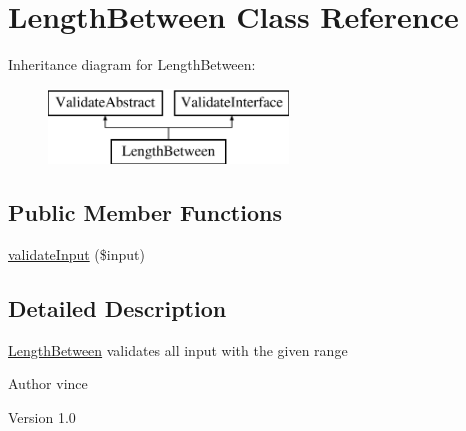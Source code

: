 \hypertarget{class_anemo_1_1_validate_1_1_adapter_1_1_length_between}{
\section{LengthBetween Class Reference}
\label{class_anemo_1_1_validate_1_1_adapter_1_1_length_between}
}
Inheritance diagram for LengthBetween:\begin{figure}[H]
\begin{center}
\leavevmode
\includegraphics[height=2.000000cm]{class_anemo_1_1_validate_1_1_adapter_1_1_length_between}
\end{center}
\end{figure}
\subsection*{Public Member Functions}
\begin{DoxyCompactItemize}
\item 
\hyperlink{class_anemo_1_1_validate_1_1_adapter_1_1_length_between_aaa5a5ce40dbb70cc1caa4482c0b7aa33}{validateInput} (\$input)
\end{DoxyCompactItemize}


\subsection{Detailed Description}
\hyperlink{class_anemo_1_1_validate_1_1_adapter_1_1_length_between}{LengthBetween} validates all input with the given range \begin{DoxyAuthor}{Author}
vince 
\end{DoxyAuthor}
\begin{DoxyVersion}{Version}
1.0 
\end{DoxyVersion}


